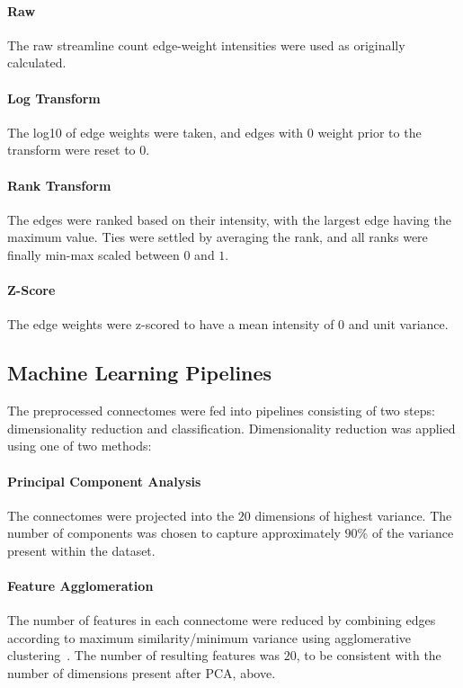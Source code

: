 \documentclass[10pt]{SelfArx} %
\begin{document}
\paragraph{Raw} The raw streamline count edge-weight intensities were used as originally calculated.

\paragraph{Log Transform} The log10 of edge weights were taken, and edges with $0$ weight prior to the transform were
reset to $0$.

\paragraph{Rank Transform} The edges were ranked based on their intensity, with the largest edge having the maximum
value. Ties were settled by averaging the rank, and all ranks were finally min-max scaled between $0$ and $1$.

\paragraph{Z-Score} The edge weights were z-scored to have a mean intensity of $0$ and unit variance.

\subsection*{Machine Learning Pipelines}

The preprocessed connectomes were fed into pipelines consisting of two steps: dimensionality reduction and
classification. Dimensionality reduction was applied using one of two methods:

\paragraph{Principal Component Analysis} The connectomes were projected into the $20$ dimensions of highest variance.
The number of components was chosen to capture approximately $90\%$ of the variance present within the dataset.

\paragraph{Feature Agglomeration} The number of features in each connectome were reduced by combining edges according
to maximum similarity/minimum variance using agglomerative clustering~\cite{Ward1963-uh}. The number of resulting
features was $20$, to be consistent with the number of dimensions present after PCA, above.
\end{document}

